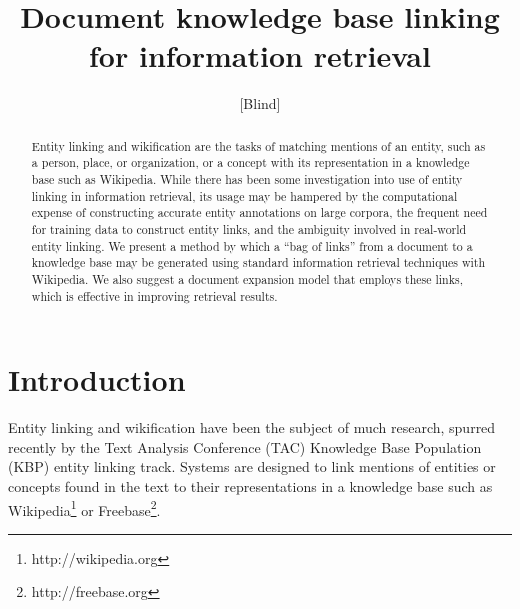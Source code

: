 \documentclass{sig-alternate}
\begin{document}

\author{[Blind]}

\title{Document knowledge base linking for information retrieval}

\maketitle
\begin{abstract}
Entity linking and wikification are the tasks of matching mentions of an entity, such as a person, place, or organization, or a concept with its representation in a knowledge base such as Wikipedia. While there has been some investigation into use of entity linking in information retrieval, its usage may be hampered by the computational expense of constructing accurate entity annotations on large corpora, the frequent need for training data to construct entity links, and the ambiguity involved in real-world entity linking. We present a method by which a ``bag of links'' from a document to a knowledge base may be generated using standard information retrieval techniques with Wikipedia. We also suggest a document expansion model that employs these links, which is effective in improving retrieval results.
\end{abstract}



\section{Introduction}\label{section.intro}

Entity linking and wikification have been the subject of much research, spurred recently by the Text Analysis Conference (TAC) Knowledge Base Population (KBP) entity linking track. Systems are designed to link mentions of entities or concepts found in the text to their representations in a knowledge base such as Wikipedia\footnote{http://wikipedia.org} or Freebase\footnote{http://freebase.org}.
\end{document}
